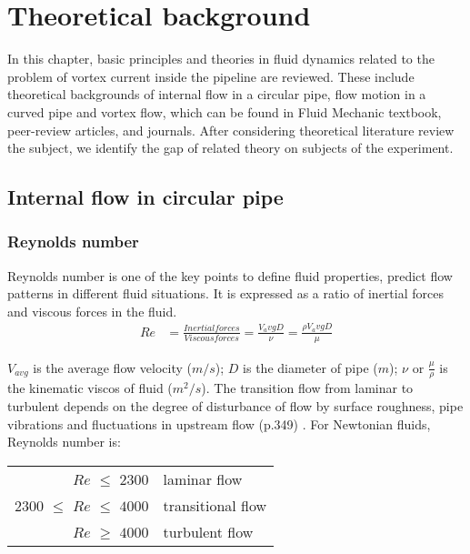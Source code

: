 
\chapter{Theoretical background}
In this chapter, basic principles and theories in fluid dynamics related to the problem of vortex current inside the pipeline are reviewed. These include theoretical backgrounds of internal flow in a circular pipe, flow motion in a curved pipe and vortex flow, which can be found in Fluid Mechanic textbook, peer-review articles, and journals. After considering theoretical literature review the subject, we identify the gap of related theory on subjects of the experiment.

\section{Internal flow in circular pipe}

\subsection{Reynolds number}

Reynolds number is one of the key points to define fluid properties, predict flow patterns in different fluid situations. It is expressed as a ratio of inertial forces and viscous forces in the fluid. 
\begin{align}
Re & = \frac{Inertial forces}{Viscous forces} = \frac{V_avg D}{\nu} = \frac{\rho V_avg D}{\mu} 
\end{align}

$V_{avg}$ is the average flow velocity ($m/s$); $D$ is the diameter of pipe ($m$); $\nu$ or $\frac{\mu}{\rho}$ is the kinematic \gls{viscos} of fluid ($m^2/s$). The transition flow from laminar to turbulent depends on the degree of disturbance of flow by surface roughness, pipe vibrations and fluctuations in upstream flow (p.349) \cite{cengel:book}. For Newtonian fluids, Reynolds number is:

\begin{table}[b]
\centering
\begin{tabular}{r l}
$Re$ $\leq$ $2300$ & laminar flow \\
2300 $\leq$ $Re$ $\leq$ $4000$ & transitional flow \\
$Re$ $\geq$ $4000$ & turbulent flow
\end{tabular}
\end{table}

